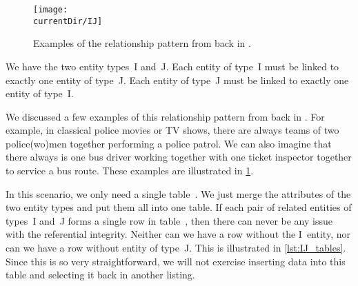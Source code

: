 %
%
\label{sec:rm:ij}%
%
\begin{figure}%
\centering%
\texttt{[image: \\currentDir/IJ]}%
\caption{Examples of the  relationship pattern from back in .}%
\label{fig:rm:ij}%
\end{figure}%
%
%
%
We have the two entity types~I and~J.
Each entity of type~I must be linked to exactly one entity of type~J.
Each entity of type~J must be linked to exactly one entity of type~I.

We discussed a few examples of this relationship pattern from back in .
For example, in classical police movies or TV shows, there are always teams of two police(wo)men together performing a police patrol.
We can also imagine that there always is one bus driver working together with one ticket inspector together to service a bus route.
These examples are illustrated in \cref{fig:rm:ij}.

In this scenario, we only need a single table~\cite{S2024D:MEDTRDM}.
We just merge the attributes of the two entity types and put them all into one table.
If each pair of related entities of types~I and~J forms a single row in table~, then there can never be any issue with the referential integrity.
Neither can we have a row without the I~entity, nor can we have a row without entity of type~J.
This is illustrated in \cref{lst:IJ_tables}.
Since this is so very straightforward, we will not exercise inserting data into this table and selecting it back in another listing.%
%
\FloatBarrier%
\endhsection%
%
